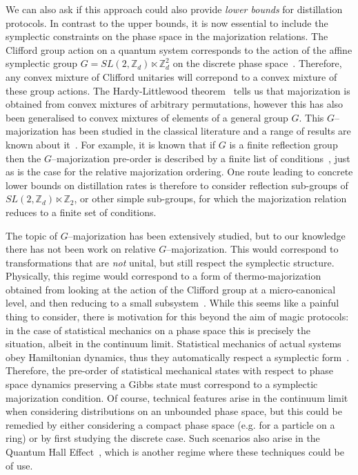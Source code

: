 \documentclass[pra,
aps,
twocolumn,
superscriptaddress,
groupedaddress,
nofootinbib,
reprint
]{revtex4-1}
\begin{document}
We can also ask if this approach could also provide \emph{lower bounds} for distillation protocols. In contrast to the upper bounds, it is now essential to include the symplectic constraints on the phase space in the majorization relations. The Clifford group action on a quantum system corresponds to the action of the affine symplectic group $G=SL(2,\mathbb{Z}_d) \ltimes \mathbb{Z}_d^2$ on the discrete phase space~\cite{cit:gross3, cit:bengtsson}. Therefore, any convex mixture of Clifford unitaries will correpond to a convex mixture of these group actions. The Hardy-Littlewood theorem~\cite{hardy_1952} tells us that majorization is obtained from convex mixtures of arbitrary permutations, however this has also been generalised to convex mixtures of elements of a general group $G$. This $G$--majorization has been studied in the classical literature and a range of results are known about it~\cite{giovagnoli_1985, steerneman_1990, eaton_1977}. For example, it is known that if $G$ is a finite reflection group then the $G$--majorization pre-order is described by a finite list of conditions~\cite{giovagnoli_1985}, just as is the case for the relative majorization ordering. One route leading to concrete lower bounds on distillation rates is therefore to consider reflection sub-groups of $SL(2,\mathbb{Z}_d) \ltimes \mathbb{Z}_2$, or other simple sub-groups, for which the majorization relation reduces to a finite set of conditions.
  
The topic of $G$--majorization has been extensively studied, but to our knowledge there has not been work on relative $G$--majorization. This would correspond to transformations that are \emph{not} unital, but still respect the symplectic structure. Physically, this regime would correspond to a form of thermo-majorization obtained from looking at the action of the Clifford group at a micro-canonical level, and then reducing to a small subsystem~\cite{Pathria_1997}. While this seems like a painful thing to consider, there is motivation for this beyond the aim of magic protocols: in the case of statistical mechanics on a phase space this is precisely the situation, albeit in the continuum limit. Statistical mechanics of actual systems obey Hamiltonian dynamics, thus they automatically respect a symplectic form~\cite{Arnold_2000, Pathria_1997}. Therefore, the pre-order of statistical mechanical states with respect to phase space dynamics preserving a Gibbs state must correspond to a symplectic majorization condition. Of course, technical features arise in the continuum limit when considering distributions on an unbounded phase space, but this could be remedied by either considering a compact phase space (e.g. for a particle on a ring) or by first studying the discrete case. Such scenarios also arise in the Quantum Hall Effect~\cite{Klitzing_1980}, which is another regime where these techniques could be of use.
\end{document}

